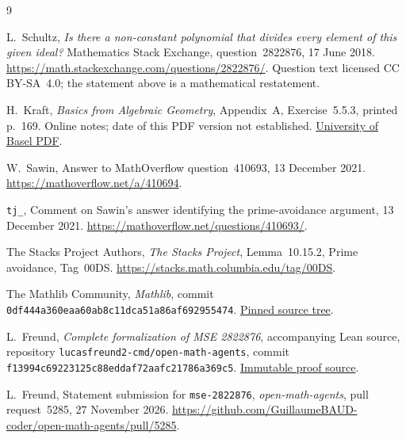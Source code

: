 \documentclass[11pt]{article}
\theoremstyle{remark}
\begin{document}
\begin{thebibliography}{9}
\small
\raggedright

L.~Schultz,
\emph{Is there a non-constant polynomial that divides every element of
this given ideal?}
Mathematics Stack Exchange, question~2822876, 17 June 2018.
\url{https://math.stackexchange.com/questions/2822876/}.
Question text licensed CC BY-SA~4.0; the statement above is a
mathematical restatement.

H.~Kraft,
\emph{Basics from Algebraic Geometry}, Appendix~A, Exercise~5.5.3,
printed p.~169. Online notes; date of this PDF version not established.
\href{https://dmi.unibas.ch/fileadmin/user_upload/dmi/Personen/Kraft_Hanspeter/Algebraic_Geometry.pdf}{University of Basel PDF}.

W.~Sawin,
Answer to MathOverflow question~410693, 13 December 2021.
\url{https://mathoverflow.net/a/410694}.

\texttt{tj\_},
Comment on Sawin's answer identifying the prime-avoidance argument,
13 December 2021.
\url{https://mathoverflow.net/questions/410693/}.

The Stacks Project Authors,
\emph{The Stacks Project}, Lemma~10.15.2, Prime avoidance, Tag~00DS.
\url{https://stacks.math.columbia.edu/tag/00DS}.

The Mathlib Community,
\emph{Mathlib}, commit
\texttt{0df444a360eaa60ab8c11dca51a86af692955474}.
\href{https://github.com/leanprover-community/mathlib4/tree/0df444a360eaa60ab8c11dca51a86af692955474}{Pinned source tree}.

L.~Freund,
\emph{Complete formalization of MSE 2822876}, accompanying Lean source,
repository \texttt{lucasfreund2-cmd/open-math-agents},
commit \texttt{f13994c69223125c88eddaf72aafc21786a369c5}.
\href{https://github.com/lucasfreund2-cmd/open-math-agents/blob/f13994c69223125c88eddaf72aafc21786a369c5/proofs/mse-2822876.lean}{Immutable proof source}.

L.~Freund,
Statement submission for \texttt{mse-2822876},
\emph{open-math-agents}, pull request~5285, 27 November 2026.
\url{https://github.com/GuillaumeBAUD-coder/open-math-agents/pull/5285}.

\end{thebibliography}
\end{document}
